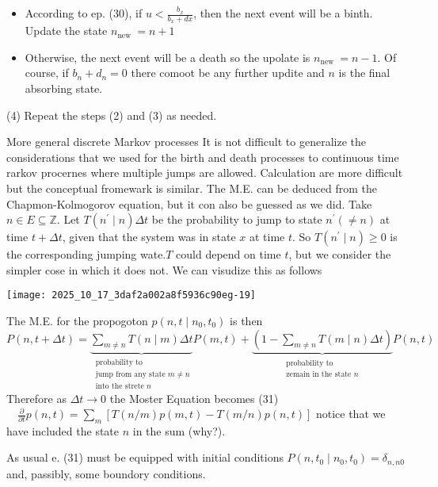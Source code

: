 \begin{itemize}
  \item According to ep. (30), if $u<\frac{b_{x}}{b_{x}+d x}$, then the next event will be a binth. Update the state $n_{\text {new }}=n+1$
  \item Otherwise, the next event will be a death so the upolate is $n_{\text {new }}=n-1$.
Of course, if $b_{n}+d_{n}=0$ there comoot be any further updite and $n$ is the final absorbing state.
\end{itemize}
(4) Repeat the steps (2) and (3) as needed.

More general discrete Markov processes
It is not difficult to generalize the considerations that we used for the birth and death processes to continuous time rarkov procernes where multiple jumps are allowed. Calculation are more difficult but the conceptual fromewark is similar. The M.E. can be deduced from the Chapmon-Kolmogorov equation, but it con also be guessed as we did. Take $n \in E \subseteq \mathbb{Z}$.
Let $T\left(n^{\prime} \mid n\right) \Delta t$ be the probability to jump to state $n^{\prime}(\neq n)$ at time $t+\Delta t$, given that the system was in state $x$ at time $t$.
So $T\left(n^{\prime} \mid n\right) \geqslant 0$ is the corresponding jumping wate.$T$ could depend on time $t$, but we consider the simpler cose in which it does not. We can visudize this as follows
\begin{center}
\texttt{[image: 2025\_10\_17\_3daf2a002a8f5936c90eg-19]}
\end{center}

The M.E. for the propogoton $p\left(n, t \mid n_{0}, t_{0}\right)$ is then
$P(n, t+\Delta t)=\underbrace{\sum_{m \neq n} T(n \mid m) \Delta t}_{\substack{\text { probability to } \\ \text { jump from any state } m \neq n \\ \text{ into the strete } n}} P(m, t)+\underbrace{\left(1-\sum_{m \neq n} T(m \mid n) \Delta t\right)}_{\substack{\text{probability to} \\ \text{zemain in the state } n}} P(n, t)$
Therefore as $\Delta t \rightarrow 0$ the Moster Equation becomes
(31) $\quad \frac{\partial}{\partial t} p(n, t)=\sum_{m}[T(n / m) p(m, t)-T(m / n) p(n, t)]$
notice that we have included the state $n$ in the sum (why?).

As usual e. (31) must be equipped with initial conditions $P\left(n, t_{0} \mid n_{0}, t_{0}\right)=\delta_{n, n 0}$ and, passibly, some boundory conditions.

